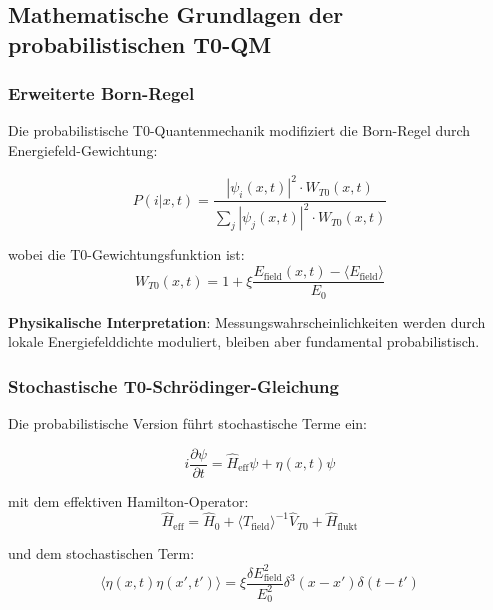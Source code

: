 \documentclass[12pt,a4paper]{article}
\newcommand{\xipar}{\xi}
\theoremstyle{definition}
\theoremstyle{remark}
\begin{document}
\subsection{Mathematische Grundlagen der probabilistischen T0-QM}

\subsubsection{Erweiterte Born-Regel}

Die probabilistische T0-Quantenmechanik modifiziert die Born-Regel durch Energiefeld-Gewichtung:

\begin{equation}
	\boxed{P(i|x,t) = \frac{|\psi_i(x,t)|^2 \cdot W_{T0}(x,t)}{\sum_j |\psi_j(x,t)|^2 \cdot W_{T0}(x,t)}}
	\label{eq:modified_born_rule}
\end{equation}

wobei die T0-Gewichtungsfunktion ist:
\begin{equation}
	W_{T0}(x,t) = 1 + \xipar \frac{E_{\text{field}}(x,t) - \langle E_{\text{field}} \rangle}{E_0}
	\label{eq:t0_weighting}
\end{equation}

\textbf{Physikalische Interpretation}: Messungswahrscheinlichkeiten werden durch lokale Energiefelddichte moduliert, bleiben aber fundamental probabilistisch.

\subsubsection{Stochastische T0-Schrödinger-Gleichung}

Die probabilistische Version führt stochastische Terme ein:

\begin{equation}
	\boxed{i\frac{\partial\psi}{\partial t} = \hat{H}_{\text{eff}} \psi + \eta(x,t) \psi}
	\label{eq:stochastic_schrodinger}
\end{equation}

mit dem effektiven Hamilton-Operator:
\begin{equation}
	\hat{H}_{\text{eff}} = \hat{H}_0 + \langle T_{\text{field}} \rangle^{-1} \hat{V}_{T0} + \hat{H}_{\text{flukt}}
	\label{eq:effective_hamiltonian}
\end{equation}

und dem stochastischen Term:
\begin{equation}
	\langle \eta(x,t) \eta(x',t') \rangle = \xipar \frac{\delta E_{\text{field}}^2}{E_0^2} \delta^3(x-x') \delta(t-t')
	\label{eq:stochastic_correlations}
\end{equation}
\end{document}
